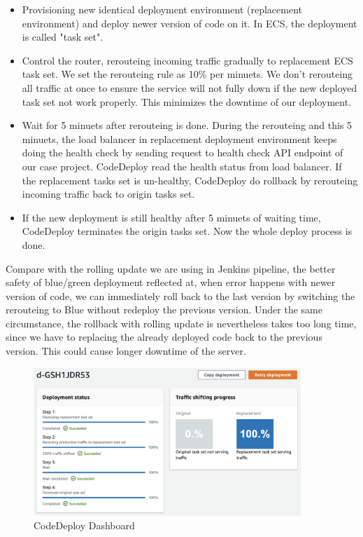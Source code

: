 \begin{itemize}
    \item Provisioning new identical deployment environment (replacement environment) and deploy newer version of code on it. In ECS, the deployment is called "task set".
    \item Control the router, rerouteing incoming traffic gradually to replacement ECS task set. We set the rerouteing rule as 10\% per minuets. We don't rerouteing all traffic at once to ensure the service will not fully down if the new deployed task set not work properly. This minimizes the downtime of our deployment.
    \item Wait for 5 minuets after rerouteing is done. During the rerouteing and this 5 minuets, the load balancer in replacement deployment environment keeps doing the health check by sending request to health check API endpoint of our case project. CodeDeploy read the health status from load balancer. If the replacement tasks set is un-healthy, CodeDeploy do rollback by rerouteing incoming traffic back to origin tasks set.
    \item If the new deployment is still healthy after 5 minuets of waiting time, CodeDeploy terminates the origin tasks set. Now the whole deploy process is done.
\end{itemize}
Compare with the rolling update we are using in Jenkins pipeline, the better safety of blue/green deployment reflected at, when error happens with newer version of code, we can immediately roll back to the last version by switching the rerouteing to Blue \cite{UsingBlu65:online} without redeploy the previous version. Under the same circumstance, the rollback with rolling update is nevertheless takes too long time, since we have to replacing the already deployed code back to the previous version. This could cause longer downtime of the server. 
\begin{figure}[h]
    \centering
    \includegraphics[width=0.90\textwidth]{pics/codedeploy_steps.png}
    \caption{CodeDeploy Dashboard}
    \label{fig:codedeploy_steps}
\end{figure}

